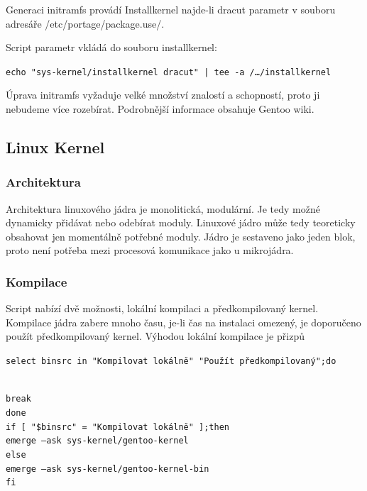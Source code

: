 \documentclass[12pt,a4paper,twoside,]{article}
\begin{document}
{Generaci initramfs provádí Installkernel najde-li dracut parametr v souboru adresáře /etc/portage/package.use/.

Script parametr vkládá do souboru installkernel:

\texttt{echo "sys-kernel/installkernel dracut" | tee -a /\dots/installkernel}

Úprava initramfs vyžaduje velké množství znalostí a schopností, proto ji nebudeme více rozebírat. Podrobnější informace obsahuje Gentoo wiki. %

\newpage
\subsection{\textsf{Linux Kernel}}

\subsubsection{\textsf{Architektura}}
Architektura linuxového jádra je monolitická, modulární. Je tedy možné dynamicky přidávat nebo odebírat moduly. Linuxové jádro může tedy teoreticky obsahovat jen momentálně potřebné moduly. Jádro je sestaveno jako jeden blok, proto není potřeba mezi procesová komunikace jako u mikrojádra. 
\subsubsection{\textsf{Kompilace}}
Script nabízí dvě možnosti, lokální kompilaci a předkompilovaný kernel. Kompilace jádra zabere mnoho času, je-li čas na instalaci omezený, je doporučeno použít předkompilovaný kernel. Výhodou lokální kompilace je přizpů 

\hspace{-1.5em}\texttt{select binsrc in "Kompilovat lokálně" "Použít předkompilovaný";do}}\\
\texttt{break}\\
\texttt{done}\\
\texttt{if [ "\$binsrc" = "Kompilovat lokálně" ];then}\\
\texttt{\hspace*{1.5em}emerge --ask sys-kernel/gentoo-kernel}\\
\texttt{else}\\
\texttt{\hspace*{1.5em}emerge --ask sys-kernel/gentoo-kernel-bin}\\
\texttt{fi}\\
\end{document}

